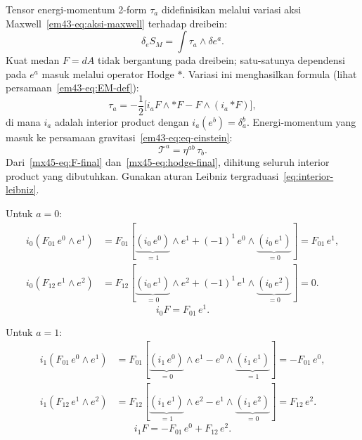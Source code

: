 Tensor energi-momentum 2-form $\tau_a$ didefinisikan melalui variasi aksi Maxwell~\eqref{em43-eq:aksi-maxwell} terhadap dreibein:
\begin{equation}
    \delta_e S_M = \int \tau_a \wedge \delta e^a.
\end{equation}
Kuat medan $F = dA$ tidak bergantung pada dreibein; satu-satunya dependensi pada $e^a$ masuk melalui operator Hodge $*$. Variasi ini menghasilkan formula (lihat persamaan~\eqref{em43-eq:EM-def}):
\begin{equation}
    \tau_a = -\frac{1}{2}\Big[i_a F \wedge {*F} - F \wedge (i_a\,{*F})\Big], \label{mx45-eq:EM-def}
\end{equation}
di mana $i_a$ adalah interior product dengan $i_a(e^b) = \delta^b_a$. Energi-momentum yang masuk ke persamaan gravitasi~\eqref{em43-eq:eq-einstein}:\label{mx45-eq:einstein-charged}
\begin{equation}
    \mathcal{T}^a = \eta^{ab}\,\tau_b. \label{mx45-eq:T-raised}
\end{equation}
Dari~\eqref{mx45-eq:F-final} dan~\eqref{mx45-eq:hodge-final}, dihitung seluruh interior product yang dibutuhkan. Gunakan aturan Leibniz tergraduasi~\eqref{eq:interior-leibniz}.

\noindent Untuk $a = 0$:
\begin{align}
    i_0(F_{01}\,e^0 \wedge e^1) &= F_{01}\!\left[\underbrace{(i_0\,e^0)}_{=1}\wedge e^1 + (-1)^1\,e^0 \wedge\underbrace{(i_0\,e^1)}_{=0}\right] = F_{01}\,e^1, \\[4pt]
    i_0(F_{12}\,e^1 \wedge e^2) &= F_{12}\!\left[\underbrace{(i_0\,e^1)}_{=0}\wedge e^2 + (-1)^1\,e^1 \wedge\underbrace{(i_0\,e^2)}_{=0}\right] = 0.
\end{align}
\begin{equation}
    i_0 F = F_{01}\,e^1.
\end{equation}

\noindent Untuk $a = 1$:
\begin{align}
    i_1(F_{01}\,e^0 \wedge e^1) &= F_{01}\!\left[\underbrace{(i_1\,e^0)}_{=0}\wedge e^1 - e^0 \wedge\underbrace{(i_1\,e^1)}_{=1}\right] = -F_{01}\,e^0, \\[4pt]
    i_1(F_{12}\,e^1 \wedge e^2) &= F_{12}\!\left[\underbrace{(i_1\,e^1)}_{=1}\wedge e^2 - e^1 \wedge\underbrace{(i_1\,e^2)}_{=0}\right] = F_{12}\,e^2.
\end{align}
\begin{equation}
    i_1 F = -F_{01}\,e^0 + F_{12}\,e^2.
\end{equation}

